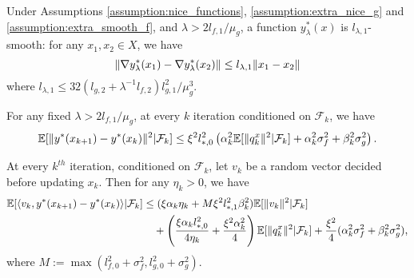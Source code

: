 \begin{lemma}
    \label{lemma:nice_y_star_lagrangian}
    Under Assumptions \ref{assumption:nice_functions}, \ref{assumption:extra_nice_g} and \ref{assumption:extra_smooth_f}, and $\lambda > 2l_{f,1} / \mu_g$, a function $y_{\lambda}^*(x)$ is $l_{\lambda,1}$-smooth: for any $x_1, x_2 \in X$, we have $$\|\nabla y_\lambda^*(x_1) - \nabla y_\lambda^*(x_2)\| \le l_{\lambda, 1} \|x_1 - x_2\|$$ where $l_{\lambda,1} \le 32 (l_{g,2} + \lambda^{-1} l_{f,2}) l_{g,1}^2 / \mu_g^3$.
\end{lemma}










\begin{lemma}
    \label{lemma:y_star_contraction}
    For any fixed $\lambda > 2l_{f,1} / \mu_g$, at every $k$ iteration conditioned on $\mathcal{F}_k$, we have
    \begin{align*}
        \mathbb{E}[\|y^*(x_{k+1}) - y^*(x_k)\|^2| \mathcal{F}_k] \le \xi^2 l_{*,0}^2 \left( \alpha_k^2 \mathbb{E}[\|q_k^x\|^2 | \mathcal{F}_k] + \alpha_k^2 \sigma_f^2 + \beta_k^2 \sigma_g^2 \right). 
    \end{align*}
\end{lemma}




\begin{lemma}
    \label{lemma:y_star_smoothness_bound}
    At every $k^{th}$ iteration, conditioned on $\mathcal{F}_k$, let $v_k$ be a random vector decided before updating $x_k$. Then for any $\eta_k > 0$, we have
    \begin{align*}
        \mathbb{E}[\langle v_k, y^*(x_{k+1}) - y^*(x_k) \rangle | \mathcal{F}_k ] &\le (\xi \alpha_k \eta_k + M \xi^2 l_{*,1}^2 \beta_k^2) \mathbb{E}[\|v_k\|^2 | \mathcal{F}_k] \\
        &\quad + \left(\frac{\xi \alpha_k l_{*,0}^2}{4\eta_k} + \frac{\xi^2 \alpha_k^2}{4}\right) \mathbb{E}[\|q_k^x\|^2 | \mathcal{F}_k] + \frac{\xi^2}{4}(\alpha_k^2 \sigma_f^2 + \beta_k^2 \sigma_g^2),
    \end{align*}
    where $M := \max\left(l_{f,0}^2 + \sigma_f^2, l_{g,0}^2 + \sigma_g^2\right)$.
\end{lemma}



